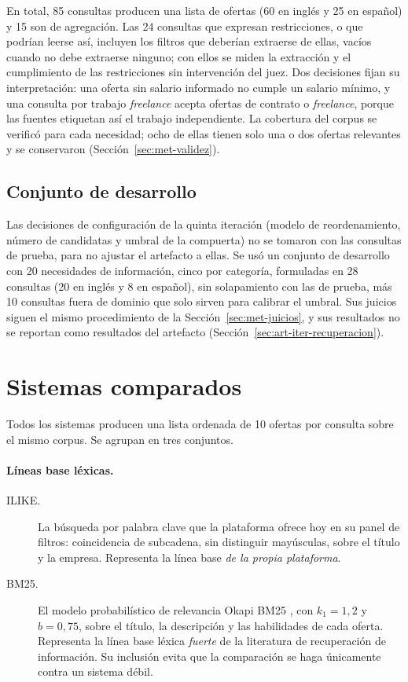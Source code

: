 En total, 85 consultas producen una lista de ofertas (60 en inglés y 25 en español) y 15 son de agregación. Las 24 consultas que expresan restricciones, o que podrían leerse así, incluyen los filtros que deberían extraerse de ellas, vacíos cuando no debe extraerse ninguno; con ellos se miden la extracción y el cumplimiento de las restricciones sin intervención del juez. Dos decisiones fijan su interpretación: una oferta sin salario informado no cumple un salario mínimo, y una consulta por trabajo \textit{freelance} acepta ofertas de contrato o \textit{freelance}, porque las fuentes etiquetan así el trabajo independiente. La cobertura del corpus se verificó para cada necesidad; ocho de ellas tienen solo una o dos ofertas relevantes y se conservaron (Sección~\ref{sec:met-validez}).

\subsection{Conjunto de desarrollo}

Las decisiones de configuración de la quinta iteración (modelo de reordenamiento, número de candidatas y umbral de la compuerta) no se tomaron con las consultas de prueba, para no ajustar el artefacto a ellas. Se usó un conjunto de desarrollo con 20 necesidades de información, cinco por categoría, formuladas en 28 consultas (20 en inglés y 8 en español), sin solapamiento con las de prueba, más 10 consultas fuera de dominio que solo sirven para calibrar el umbral. Sus juicios siguen el mismo procedimiento de la Sección~\ref{sec:met-juicios}, y sus resultados no se reportan como resultados del artefacto (Sección~\ref{sec:art-iter-recuperacion}).

\section{Sistemas comparados}
\label{sec:met-sistemas}

Todos los sistemas producen una lista ordenada de 10 ofertas por consulta sobre el mismo corpus. Se agrupan en tres conjuntos.

\paragraph{Líneas base léxicas.}
\begin{description}
    \item[ILIKE.] La búsqueda por palabra clave que la plataforma ofrece hoy en su panel de filtros: coincidencia de subcadena, sin distinguir mayúsculas, sobre el título y la empresa. Representa la línea base \emph{de la propia plataforma}.
    \item[BM25.] El modelo probabilístico de relevancia Okapi BM25 \citep{Robertson2009}, con $k_1 = 1{,}2$ y $b = 0{,}75$, sobre el título, la descripción y las habilidades de cada oferta. Representa la línea base léxica \emph{fuerte} de la literatura de recuperación de información. Su inclusión evita que la comparación se haga únicamente contra un sistema débil.
\end{description}

